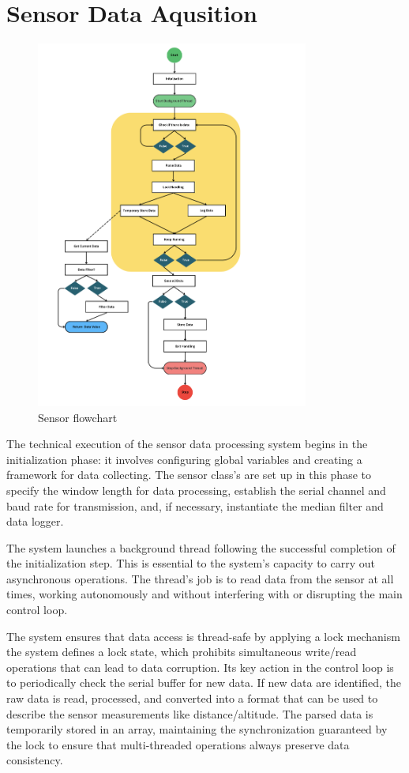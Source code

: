 \documentclass{report}
\begin{document}
\section{Sensor Data Aqusition}
\begin{figure}[H]
  \centering
  \includegraphics[width=0.8\textwidth]{Pictures/sensor_flowchart.png}
  \caption{Sensor flowchart}
  \label{fig:Sensor_flowchart}
\end{figure}
The technical execution of the sensor data processing system begins in the
initialization phase: it involves configuring global variables and creating a
framework for data collecting. The sensor class's are set up in this phase to
specify the window length for data processing, establish the serial channel and
baud rate for transmission, and, if necessary, instantiate the median filter and
data logger. 

The system launches a background thread following the successful completion of
the initialization step. This is essential to the system's capacity to carry out
asynchronous operations. The thread's job is to read data from the sensor at all
times, working autonomously and without interfering with or disrupting the main
control loop. 

The system ensures that data access is thread-safe by applying a lock mechanism
the system defines a lock state, which prohibits simultaneous write/read
operations that can lead to data corruption. Its key action in the control loop
is to periodically check the serial buffer for new data. If new data are
identified, the raw data is read, processed, and converted into a format that
can be used to describe the sensor measurements like distance/altitude. The
parsed data is temporarily stored in an array, maintaining the synchronization
guaranteed by the lock to ensure that multi-threaded operations always preserve
data consistency. 
\end{document}
